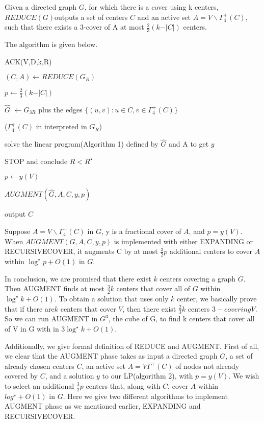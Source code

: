 \begin{theorem}
Given a directed graph $G$, for which there is a cover using k centers, $REDUCE (G)$outputs a set of centers $C$ and an active set $A=V\backslash \Gamma_4^+(C)$, such that there exists a 3-cover of A at most $\frac23(k-\vert C\vert)$ centers.
\end{theorem}
The algorithm is given below.

\begin{algorithm}
\caption{ACK(V,D,k,R)}
\begin{algorithmic} 
\STATE $(C,A) \leftarrow REDUCE(G_R)$

\STATE $p \leftarrow \frac23(k- \vert C \vert)$

\STATE $\hat{G}$ $\leftarrow G_{3R}$ plus the edges $\{(u,v):u\in C, v\in  \Gamma_4^+(C)\}$

\STATE ($\Gamma_4^+(C)$ in interpreted in $G_R$)

\STATE solve the linear program(Algorithm 1) defined by $\hat{G}$  and A to get $y$


        \STATE   STOP and conclude $R< R^\star$
        
\ELSE

        \STATE$p \leftarrow y(V)$
        
        \STATE$AUGMENT(\hat{G},A,C,y,p)$
        
\ENDIF
\STATE output $C$
\end{algorithmic}
\end{algorithm}

\begin{theorem}
Suppose $A=V\backslash \Gamma_4^+(C)$ in $G$, y is a fractional cover of $A$, and $p=y(V)$. When $AUGMENT(G,A,C,y,p)$ is implemented with either EXPANDING or RECURSIVECOVER, it augments C by at most  $\frac32 p$ additional centers to cover $ A $ within $\log^\star p + O(1)$ in $G$.
\end{theorem}

In conclusion, we are promised that there exist $k$ centers covering a graph $G$. Then AUGMENT finds at  most $\frac 32 k$ centers that cover all of $G$ within $\log^\star k + O(1)$. To obtain a solution that uses only $k$ center, we basically prove that if there are$ k$ centers that cover $V$, then there exist $\frac23k$ centers $3-covering$$ V$. So we can run AUGMENT in $G^3$, the cube of G, to find k centers that cover all of V in G with in $3\log^\star k + O(1)$.

Additionally, we give formal definition of REDUCE and AUGMENT. First of all, we clear that the AUGMENT phase takes as input a directed graph $G$, a set of already chosen centers $C$, an active set $A= V\Gamma^+(C)$ of nodes not already covered by $C$, and a solution $y$ to our LP(algorithm 2), with $p=y(V)$. We wish to select an additional $\frac{3}{2}p$ centers that, along with $C$, cover $A$ within $log^{\star}+O(1)$ in $G$. Here we give two different algorithms to implement AUGMENT phase as we mentioned earlier, EXPANDING and RECURSIVECOVER.

